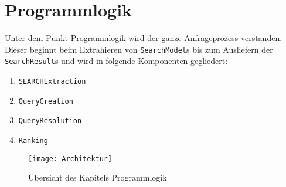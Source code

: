 
\chapter{Programmlogik}

Unter dem Punkt Programmlogik wird der ganze Anfrageprozess verstanden. Dieser beginnt beim Extrahieren von \lstinline|SearchModel|s bis zum Ausliefern der \lstinline|SearchResult|s und wird in folgende Komponenten gegliedert:

\begin{enumerate}
     \item \lstinline|SEARCHExtraction|
     \item \lstinline|QueryCreation|
     \item \lstinline|QueryResolution|
     \item \lstinline|Ranking|
\end{enumerate}

\begin{figure}[htb]
  \centering
  \texttt{[image: Architektur]}
  \caption{Übersicht des Kapitels Programmlogik}
\end{figure}





%


\pagebreak


